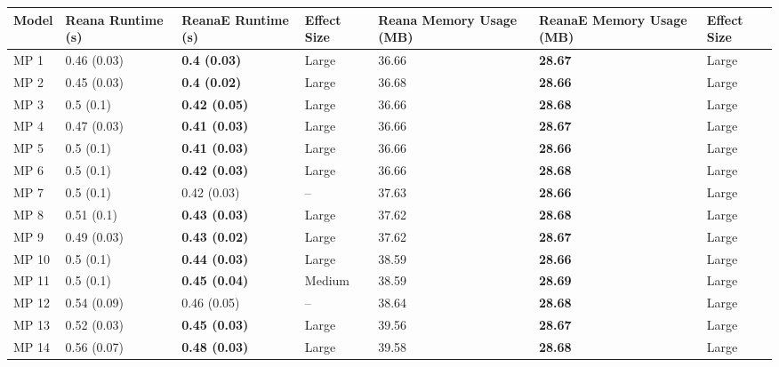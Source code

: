 \begin{tabular}{lllllll}
\toprule
 Model & Reana Runtime (s) &    ReanaE Runtime (s) & Effect Size & Reana Memory Usage (MB) & ReanaE Memory Usage (MB) & Effect Size \\
\midrule
  MP 1 &       0.46 (0.03) &   \textbf{0.4 (0.03)} &       Large &                   36.66 &           \textbf{28.67} &       Large \\
  MP 2 &       0.45 (0.03) &   \textbf{0.4 (0.02)} &       Large &                   36.68 &           \textbf{28.66} &       Large \\
  MP 3 &         0.5 (0.1) &  \textbf{0.42 (0.05)} &       Large &                   36.66 &           \textbf{28.68} &       Large \\
  MP 4 &       0.47 (0.03) &  \textbf{0.41 (0.03)} &       Large &                   36.66 &           \textbf{28.67} &       Large \\
  MP 5 &         0.5 (0.1) &  \textbf{0.41 (0.03)} &       Large &                   36.66 &           \textbf{28.66} &       Large \\
  MP 6 &         0.5 (0.1) &  \textbf{0.42 (0.03)} &       Large &                   36.66 &           \textbf{28.68} &       Large \\
  MP 7 &         0.5 (0.1) &           0.42 (0.03) &          -- &                   37.63 &           \textbf{28.66} &       Large \\
  MP 8 &        0.51 (0.1) &  \textbf{0.43 (0.03)} &       Large &                   37.62 &           \textbf{28.68} &       Large \\
  MP 9 &       0.49 (0.03) &  \textbf{0.43 (0.02)} &       Large &                   37.62 &           \textbf{28.67} &       Large \\
 MP 10 &         0.5 (0.1) &  \textbf{0.44 (0.03)} &       Large &                   38.59 &           \textbf{28.66} &       Large \\
 MP 11 &         0.5 (0.1) &  \textbf{0.45 (0.04)} &      Medium &                   38.59 &           \textbf{28.69} &       Large \\
 MP 12 &       0.54 (0.09) &           0.46 (0.05) &          -- &                   38.64 &           \textbf{28.68} &       Large \\
 MP 13 &       0.52 (0.03) &  \textbf{0.45 (0.03)} &       Large &                   39.56 &           \textbf{28.67} &       Large \\
 MP 14 &       0.56 (0.07) &  \textbf{0.48 (0.03)} &       Large &                   39.58 &           \textbf{28.68} &       Large \\

\end{tabular}

